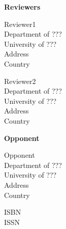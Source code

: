 \documentclass{tucsdissertation}
\begin{document}
\bigskip
\noindent \textbf{\Large Reviewers} \\ \mbox{}

 \parbox[t]{12 cm}{
  Reviewer1\\
  Department of ??? \\
  University of ??? \\
  Address \\
  Country \\ \mbox{}
}

 \parbox[t]{12 cm}{
  Reviewer2\\
  Department of ??? \\
  University of ??? \\
  Address \\
  Country \\ \mbox{}
}

\bigskip
\noindent \textbf{\Large Opponent} \\ \mbox{}

 \parbox[t]{12 cm}{
  Opponent\\
  Department of ??? \\
  University of ??? \\
  Address \\
  Country \\ \mbox{}
}

\vfill
\noindent \parbox[t]{12 cm}{
  ISBN \theisbn \\ 
  ISSN \theissn
}
\clearpage

\pagestyle{plain}
\setcounter{page}{1}


\clearpage



\clearpage


\clearpage

\tableofcontents
\cleardoublepage






%
\end{document}
